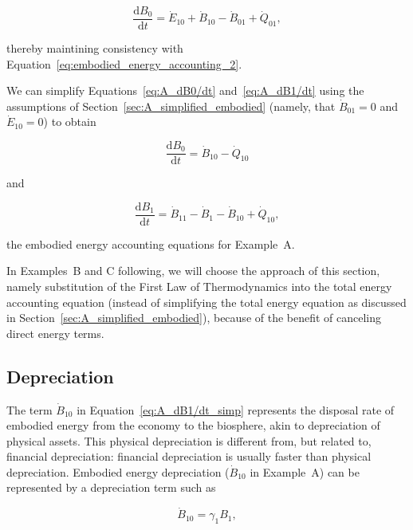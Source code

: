 \begin{equation} \label{eq:A_dB0/dt_waste_outflow}
	\frac{\mathrm{d}B_{0}}{\mathrm{d}t} 
	= \dot{E}_{10}
	+ \dot{B}_{10} 
	- \dot{B}_{01}
	+ \dot{Q}_{01},
\end{equation}

\noindent thereby maintining consistency with
Equation~\ref{eq:embodied_energy_accounting_2}.

We can simplify 
Equations~\ref{eq:A_dB0/dt} and~\ref{eq:A_dB1/dt} 
using the assumptions of Section~\ref{sec:A_simplified_embodied} 
(namely, that $\dot{B}_{01} = 0$ and $\dot{E}_{10} = 0$)
to obtain

\begin{equation} \label{eq:A_dB0/dt_simp}
	\frac{\mathrm{d}B_{0}}{\mathrm{d}t} 
	= \dot{B}_{10} 
	- \dot{Q}_{10}
\end{equation}

\noindent and

\begin{equation} \label{eq:A_dB1/dt_simp}
	\frac{\mathrm{d}B_{1}}{\mathrm{d}t} 
	= \dot{B}_{11}
	- \dot{B}_{1}
	- \dot{B}_{10}
	+ \dot{Q}_{10},
\end{equation}

\noindent the embodied energy accounting equations for 
Example~A.

In Examples~B and C following, we will choose the approach of 
this section, namely substitution of the 
First Law of Thermodynamics into the total energy accounting equation
(instead of simplifying the total energy equation 
as discussed in Section~\ref{sec:A_simplified_embodied}),
because of the benefit of canceling direct energy terms. 



\subsection{Depreciation}

The term $\dot{B}_{10}$ in Equation~\ref{eq:A_dB1/dt_simp}
represents the disposal rate 
of embodied energy from the economy to the biosphere, 
akin to depreciation of physical assets. 
This physical depreciation is different from, 
but related to, financial depreciation: 
financial depreciation is usually faster than physical depreciation. 
Embodied energy depreciation ($\dot{B}_{10}$ in Example~A) 
can be represented by a depreciation term such as

\begin{equation} \label{eq:depreciation_term_defined}
	\dot{B}_{10} = \gamma_{1}B_{1},
\end{equation}

